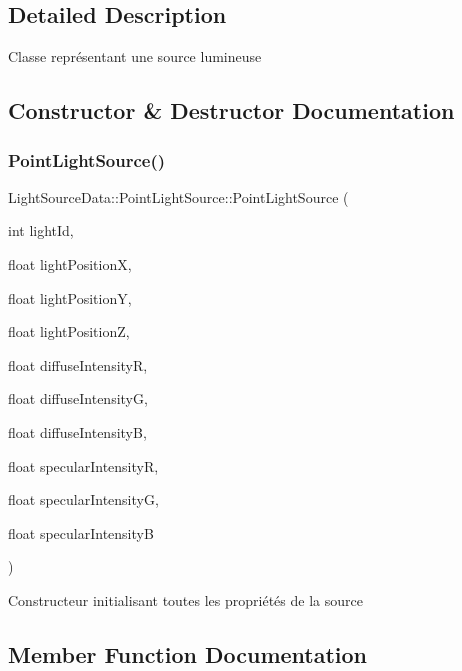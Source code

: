 \subsection{Detailed Description}
Classe représentant une source lumineuse 

\subsection{Constructor \& Destructor Documentation}
\mbox{\label{classLightSourceData_1_1PointLightSource_a1906b6949e0f33893ee3e5e00ebca9f5}} 
\subsubsection{\texorpdfstring{PointLightSource()}{PointLightSource()}}
{\footnotesize\ttfamily Light\+Source\+Data\+::\+Point\+Light\+Source\+::\+Point\+Light\+Source (\begin{DoxyParamCaption}\item[{int}]{light\+Id,  }\item[{float}]{light\+PositionX,  }\item[{float}]{light\+PositionY,  }\item[{float}]{light\+PositionZ,  }\item[{float}]{diffuse\+IntensityR,  }\item[{float}]{diffuse\+IntensityG,  }\item[{float}]{diffuse\+IntensityB,  }\item[{float}]{specular\+IntensityR,  }\item[{float}]{specular\+IntensityG,  }\item[{float}]{specular\+IntensityB }\end{DoxyParamCaption})}

Constructeur initialisant toutes les propriétés de la source 

\subsection{Member Function Documentation}
\mbox{\label{classLightSourceData_1_1PointLightSource_a6472e0a17c2d31f5eb5a98bf313f0938}} 
